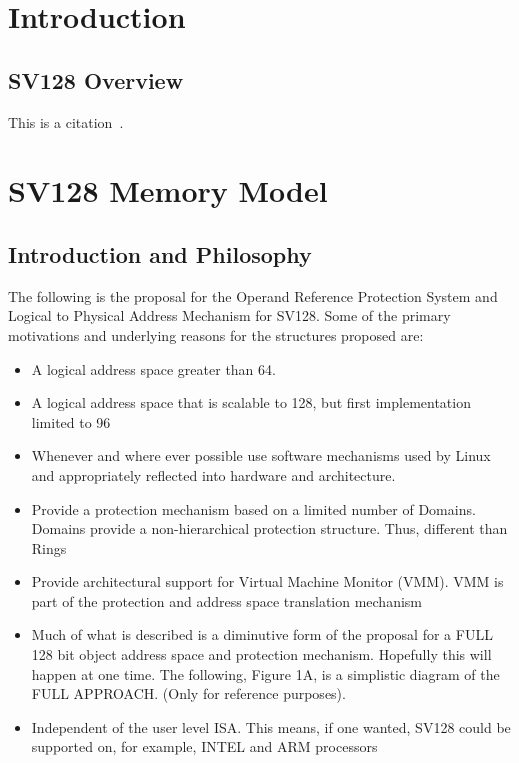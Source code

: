 \documentclass{article}
\begin{document}
\clearpage
\section{Introduction}
\label{sec:Introduction}

\subsection{SV128 Overview}
\label{sec:SV128Overview}

This is a citation~\cite{RVSuperSpec}.

\clearpage
\section{SV128 Memory Model}
\label{sec:SV128MemoryModel}


\subsection{Introduction and Philosophy}

The following is the proposal for the Operand Reference Protection System and Logical to Physical Address Mechanism for SV128.  Some of the primary motivations and underlying reasons for the structures proposed are:


\begin{itemize}
\item A logical address space greater than 64. 
\item A logical address space that is scalable to 128,  but first implementation limited to 96
\item  Whenever and where ever possible use software mechanisms used by Linux and appropriately reflected into hardware and architecture.
\item  Provide a protection mechanism based on a limited number of Domains.  Domains provide a non-hierarchical protection structure. Thus, different than Rings
\item  Provide architectural support for Virtual Machine Monitor (VMM).  VMM is part of the protection and address space translation mechanism
\item  Much of what is described is a diminutive form of the proposal for a FULL 128 bit object address space and protection mechanism.  Hopefully this will happen at one time.   The following, Figure 1A, is a  simplistic diagram of the FULL APPROACH. (Only for reference purposes).
\item  Independent of the user level ISA.  This means, if one wanted,  SV128 could be supported on, for example, INTEL and ARM processors
\end{itemize}
\end{document}
